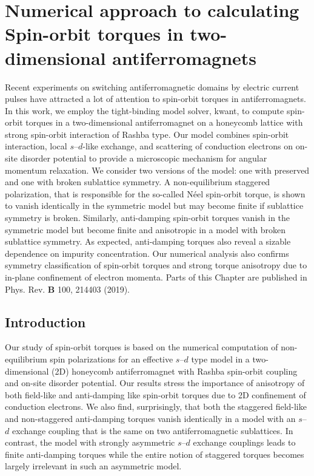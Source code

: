 \chapter{Numerical approach to calculating Spin-orbit torques in two-dimensional antiferromagnets} %
\label{ch:summit}
Recent experiments on switching antiferromagnetic domains by electric current pulses have attracted a lot of attention to spin-orbit torques in antiferromagnets. In this work, we employ the tight-binding model solver, kwant,  to compute spin-orbit torques in a two-dimensional antiferromagnet on a honeycomb lattice with strong spin-orbit interaction of Rashba type. Our model combines spin-orbit interaction, local $s$--$d$-like exchange, and scattering of conduction electrons on on-site disorder potential to provide a microscopic mechanism for angular momentum relaxation. We consider two versions of the model: one with preserved and one with broken sublattice symmetry. A non-equilibrium staggered polarization, that is responsible for the so-called N\'eel spin-orbit torque, is shown to vanish identically in the symmetric model but may become finite if sublattice symmetry is broken. Similarly, anti-damping spin-orbit torques vanish in the symmetric model but become finite and anisotropic in a model with broken sublattice symmetry. As expected, anti-damping torques also reveal a sizable dependence on impurity concentration. Our numerical analysis also confirms symmetry classification of spin-orbit torques and strong torque anisotropy due to in-plane confinement of electron momenta. 
\vfill
Parts of this Chapter are published in Phys. Rev. \textbf{B} 100, 214403 (2019).
\clearpage

\section{Introduction}
Our study of spin-orbit torques is based on the numerical computation of non-equilibrium spin polarizations for an effective $s$--$d$ type model in a two-dimensional (2D) honeycomb antiferromagnet with Rashba spin-orbit coupling and on-site disorder potential.  Our results stress the importance of anisotropy of both field-like and anti-damping like spin-orbit torques due to 2D confinement of conduction electrons. We also find, surprisingly, that both the staggered field-like and non-staggered anti-damping torques vanish identically in a model with an $s$--$d$ exchange coupling that is the same on two antiferromagnetic sublattices. In contrast, the model with strongly asymmetric $s$--$d$ exchange couplings leads to finite anti-damping torques while the entire notion of staggered torques becomes largely irrelevant in such an asymmetric  model. 

